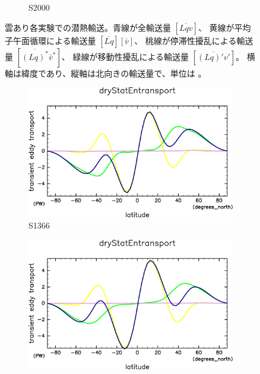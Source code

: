 \documentclass[body]{subfiles}
\begin{document}
\begin{figure}[t]
\begin{subfigure}{.4\textwidth}
		\caption{S2000}\label{潜熱S2000}
	\end{subfigure}
	\caption[雲あり各実験での潜熱輸送の内訳]{
		雲あり各実験での潜熱輸送。青線が全輸送量 \([\overline{Lqv}]\)、
		黄線が平均子午面循環による輸送量 \([\overline{Lq}][\overline{v}]\)、
		桃線が停滞性擾乱による輸送量 \([\overline{(Lq)^*}\bar v^*]\)、
		緑線が移動性擾乱による輸送量 \([\overline{(Lq)'v'}]\)。
		横軸は緯度であり、縦軸は北向きの輸送量で、単位は 。
	}\label{潜熱}
\end{figure}

\begin{figure}[t]
	\centering
	\begin{subfigure}{.4\textwidth}
		\centering
		\includegraphics[width=\textwidth]{S1366/MeriHeatTrans@dryStatEn,time=14600:14965-crop-rotate.pdf}
		\caption{S1366}\label{乾燥静的エネルギーS1366}
	\end{subfigure}
	\begin{subfigure}{.4\textwidth}
		\centering
		\includegraphics[width=\textwidth]{S1500/MeriHeatTrans@dryStatEn,time=3650:4015-crop-rotate.pdf}

\end{subfigure}
\end{figure}
\end{document}
